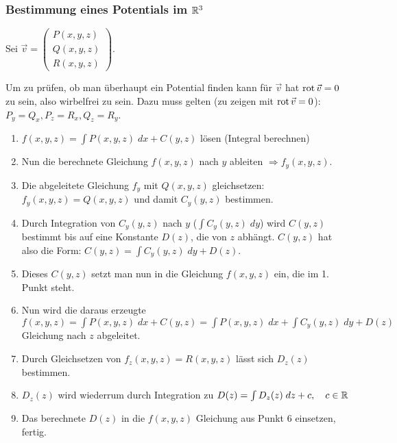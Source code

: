 \subsubsection{Bestimmung eines Potentials im $\mathbb{R}^3$}
Sei $\vec{v} = \begin{pmatrix}
P(x,y,z)\\
Q(x,y,z)\\
R(x,y,z)
\end{pmatrix}$.

Um zu prüfen, ob man überhaupt ein Potential finden kann für $\vec{v}$ hat $\operatorname{rot} \vec{v} = 0$
zu sein, also wirbelfrei zu sein. Dazu muss gelten (zu zeigen mit $\operatorname{rot} \vec{v} = 0$): $P_y = Q_x, P_z = R_x, Q_z = R_y$.

\begin{enumerate}[itemsep=1em]
	\item $f(x,y,z) = \int P(x,y,z)\;dx + C(y,z)$ lösen (Integral berechnen)
	\item Nun die berechnete Gleichung $f(x,y,z)$ nach $y$ ableiten $\Rightarrow f_y(x,y,z)$.
	\item Die abgeleitete Gleichung $f_y$ mit $Q(x,y,z)$ gleichsetzen: $f_y(x,y,z) = Q(x,y,z)$
	und damit $C_y(y,z)$ bestimmen.
	\item Durch Integration von $C_y(y,z)$ nach $y$ ($\int C_y(y,z)\;dy$) wird $C(y,z)$ bestimmt
	bis auf eine Konstante $D(z)$, die von $z$ abhängt. $C(y,z)$ hat also die Form:
	$C(y,z) = \int C_y(y,z)\; dy + D(z)$.
	\item Dieses $C(y,z)$ setzt man nun in die Gleichung $f(x,y,z)$ ein, die im 1. Punkt steht.
	\item Nun wird die daraus erzeugte
	$f(x,y,z) = \int P(x,y,z)\;dx + C(y,z) = \int P(x,y,z)\;dx + \int C_y(y,z)\; dy + D(z)$
	Gleichung nach $z$ abgeleitet.
	\item Durch Gleichsetzen von $f_z(x,y,z) = R(x,y,z)$ lässt sich $D_z(z)$ bestimmen.
	\item $D_z(z)$ wird wiederrum durch Integration zu $D(z) = \int D_z(z)\; dz + c, \quad c \in \mathbb{R}$
	\item Das berechnete $D(z)$ in die $f(x,y,z)$ Gleichung aus Punkt 6 einsetzen, fertig.
\end{enumerate}